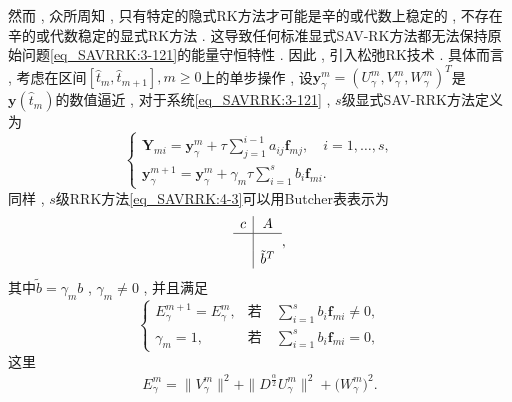 然而 , 众所周知 , 只有特定的隐式RK方法才可能是辛的或代数上稳定的 , 不存在辛的或代数稳定的显式RK方法 . 
这导致任何标准显式SAV-RK方法都无法保持原始问题\eqref{eq_SAVRRK:3-121}的能量守恒特性 . 
因此 , 引入松弛RK技术 . 具体而言 , 考虑在区间$\left[\hat{t}_m , \hat{t}_{m+1}\right] , m \geq 0$上的单步操作 , 设$\bm{y}_\gamma^m=\left(U^{m}_{\gamma} , V^{m}_{\gamma} , W^{m}_{\gamma}\right)^T$是$\bm{y}\left(\hat{t}_m\right)$的数值逼近 , 
对于系统\eqref{eq_SAVRRK:3-121} , $s$级显式SAV-RRK方法定义为
\begin{equation}
\left\{\begin{array}{l}
\bm{Y}_{m i}=\bm{y}_\gamma^m+\tau \sum\limits_{j=1}^{i-1} a_{i j} \bm{f}_{m j} , \quad i=1 , \ldots , s , \\
\bm{y}_\gamma^{m+1}=\bm{y}_\gamma^m+\gamma_m \tau \sum\limits_{i=1}^s b_i \bm{f}_{m i} . 
\end{array}\right . \label{eq_SAVRRK:4-3}
\end{equation}
同样 , $s$级RRK方法\eqref{eq_SAVRRK:4-3}可以用Butcher表表示为
\begin{equation}
\begin{array}{c|c}
c & A \\
\hline \\
& \tilde{b}^T
\end{array} , 
\end{equation}
其中$\tilde{b}=\gamma_m b$ , $\gamma_m\neq 0$ , 并且满足
\begin{equation}
\left\{\begin{array}{ll}
E_{\gamma}^{m+1}=E_{\gamma}^{m} , & \text{若} \quad  \sum\limits_{i=1}^s b_i \bm{f}_{m i} \neq 0 , \\
\gamma_m=1 , & \text{若} \quad  \sum\limits_{i=1}^s b_i \bm{f}_{m i} =0 , 
\end{array}\right . \label{eq_SAVRRK:4-6}
\end{equation}
这里
\begin{align}\label{eq_SAVRRK:4-6b}
E_{\gamma}^{m}  =\|V_{\gamma}^{m}\|^2+\|D^\frac{\alpha}{2} U_{\gamma}^{m}\|^2+\big(W_{\gamma}^{m}\big)^2 . 
\end{align}


